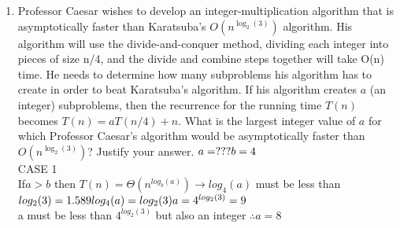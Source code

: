 \documentclass[11pt]{amsart}
\begin{document}
\begin{enumerate}
\bigskip

\item Professor Caesar wishes to develop an integer-multiplication algorithm that is asymptotically faster than Karatsuba’s $O(n^{\log_2(3)})$ algorithm. His algorithm will use the divide-and-conquer method, dividing each integer into pieces of size n/4, and the divide and combine steps together will take O(n) time. He needs to determine how many subproblems his algorithm has to create in order to beat Karatsuba’s algorithm. If his algorithm creates $a$ (an integer) subproblems, then the recurrence for the running time $T(n)$ becomes $T(n) = aT(n/4) + n$. What is the largest integer value of $a$ for which Professor Caesar’s algorithm would be asymptotically faster than $O(n^{\log_2(3)})$? Justify your answer.
\subitem $a = ???\\b = 4$\\CASE 1\\If$a>b$ then $T(n) = \Theta (n^{log_b(a)})\rightarrow log_4(a)$ must be less than $log_2(3)=1.589\\log_4(a)=log_2(3)\\a=4^{log_2(3)}=9$\\a must be less than $4^{log_2(3)}$ but also an integer $\therefore a = 8$
\end{enumerate}


\bigskip
\end{document}
